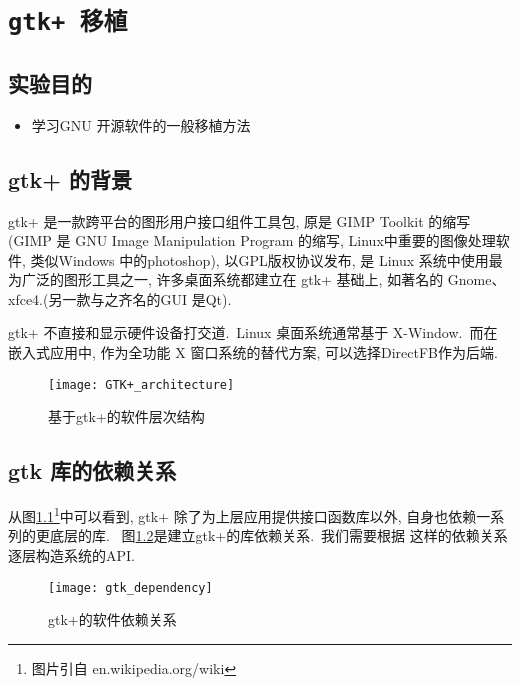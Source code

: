 \chapter{\tt gtk+ 移植}
\section{实验目的}
\begin{itemize}\itemsep=-3pt
  \item 学习GNU 开源软件的一般移植方法
\end{itemize}

\section{gtk+ 的背景}
    gtk+ 是一款跨平台的图形用户接口组件工具包, 原是 GIMP Toolkit 的缩写(GIMP 是
GNU Image Manipulation Program 的缩写, Linux中重要的图像处理软件, 类似Windows
中的photoshop), 以GPL版权协议发布, 是 Linux 系统中使用最为广泛的图形工具之一,
许多桌面系统都建立在 gtk+ 基础上, 如著名的 Gnome、xfce4.(另一款与之齐名的GUI
是Qt).

    gtk+ 不直接和显示硬件设备打交道.~Linux 桌面系统通常基于 X-Window.~而在
嵌入式应用中, 作为全功能 X 窗口系统的替代方案, 可以选择DirectFB作为后端. 

\begin{figure}
  \centering
  \texttt{[image: GTK+\_architecture]}
  \caption{基于gtk+的软件层次结构}\label{fig_gtk}
\end{figure}

\section{gtk 库的依赖关系}
从图\ref{fig_gtk}\footnote{图片引自 en.wikipedia.org/wiki}中可以看到, 
gtk+ 除了为上层应用提供接口函数库以外, 自身也依赖一系列的更底层的库.~
图\ref{fig_gtkdfb}是建立gtk+的库依赖关系.~我们需要根据
这样的依赖关系逐层构造系统的API.

\begin{figure}
  \centering
  \texttt{[image: gtk\_dependency]}
  \caption{gtk+的软件依赖关系}\label{fig_gtkdfb}
\end{figure}

